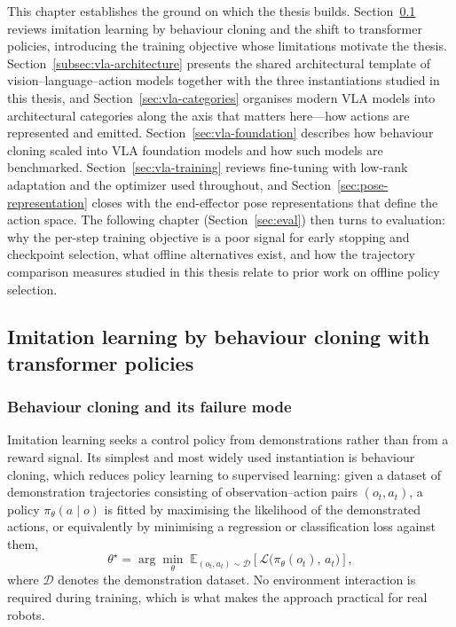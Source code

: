 \documentclass[english,12pt,a4paper,pdftex,elec,utf8]{aaltothesis}
\begin{document}
This chapter establishes the ground on which the thesis builds.
Section~\ref{sec:bc} reviews imitation learning by behaviour cloning and the
shift to transformer policies, introducing the training objective whose
limitations motivate the thesis. Section~\ref{subsec:vla-architecture} presents
the shared architectural template of vision--language--action models together
with the three instantiations studied in this thesis, and
Section~\ref{sec:vla-categories} organises modern VLA models into architectural
categories along the axis that matters here---how actions are represented and
emitted. Section~\ref{sec:vla-foundation} describes how behaviour cloning scaled
into VLA foundation models and how such models are benchmarked.
Section~\ref{sec:vla-training} reviews fine-tuning with low-rank adaptation and
the optimizer used throughout, and Section~\ref{sec:pose-representation} closes
with the end-effector pose representations that define the action space. The
following chapter (Section~\ref{sec:eval}) then turns to evaluation: why the
per-step training objective is a poor signal for early stopping and checkpoint
selection, what offline alternatives exist, and how the trajectory comparison
measures studied in this thesis relate to prior work on offline policy
selection.

\subsection{Imitation learning by behaviour cloning with transformer policies}
\label{sec:bc}

\subsubsection{Behaviour cloning and its failure mode}
\label{subsec:bc-failure}

Imitation learning seeks a control policy from demonstrations rather than from a reward signal. Its simplest and most widely used instantiation is behaviour cloning, which reduces policy learning to supervised learning: given a dataset of demonstration trajectories consisting of observation--action pairs $(o_t, a_t)$, a policy $\pi_\theta(a \mid o)$ is fitted by maximising the likelihood of the demonstrated actions, or equivalently by minimising a regression or classification loss against them,
\begin{equation}
  \label{eq:bc}
  \theta^\star = \arg\min_\theta \;
  \mathbb{E}_{(o_t, a_t) \sim \mathcal{D}}
  \left[ \mathcal{L}\big(\pi_\theta(o_t),\, a_t\big) \right],
\end{equation}
where $\mathcal{D}$ denotes the demonstration dataset. No environment interaction is required during training, which is what makes the approach practical for real robots.
\end{document}
